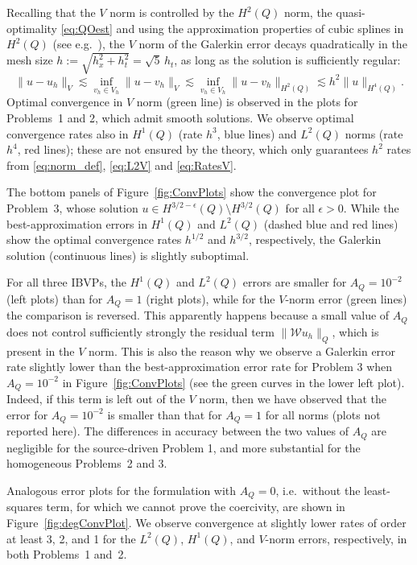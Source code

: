 \documentclass[a4paper]{article}
\theoremstyle{plain}
\theoremstyle{definition}
\newcommand{\operator}[1]{\mathcal{#1}}
\newcommand{\oW}{{\operator{W}}}
\begin{document}
Recalling that the $V$ norm is controlled by the $H^2(Q)$ norm, the quasi-optimality \eqref{eq:QOest} and using the approximation properties of cubic splines in $H^2(Q)$ (see e.g.\ \cite[Lemma~3.1]{BazilevsBeiraoCottrellHughesSangalli2006}), the $V$ norm of the Galerkin error decays quadratically in the mesh size $h:=\sqrt{h_x^2+h_t^2}=\sqrt5\, h_t$,
as long as the solution is sufficiently regular:
\begin{equation}\label{eq:RatesV}
\|u - u_h\|_V
\lesssim\inf_{v_h\in V_h}\|u - v_h\|_V
\lesssim\inf_{v_h\in V_h}\|u-v_h\|_{H^2(Q)}
\lesssim h^2 \|u\|_{H^4(Q)}.
\end{equation}
Optimal convergence in $V$ norm (green line) is observed in the plots for Problems~1 and 2, which admit smooth solutions.
We observe optimal convergence rates also in $H^1(Q)$ (rate $h^3$, blue lines) and $L^2(Q)$ norms (rate $h^4$, red lines); these are not ensured by the theory, which only guarantees $h^2$ rates from \eqref{eq:norm_def}, \eqref{eq:L2V} and \eqref{eq:RatesV}.

The bottom panels of Figure~\ref{fig:ConvPlots} show the convergence plot for Problem~3, whose solution $u\in H^{3/2-\epsilon}(Q)\setminus H^{3/2}(Q)$ for all $\epsilon>0$.
While the best-approximation errors in $H^1(Q)$ and $L^2(Q)$ (dashed blue and red lines) show the optimal convergence rates $h^{1/2}$ and $h^{3/2}$, respectively, the Galerkin solution (continuous lines) is slightly suboptimal.

For all three IBVPs, the $H^1(Q)$ and $L^2(Q)$ errors are smaller for $A_Q=10^{-2}$ (left plots) than for $A_Q=1$ (right plots), while for the $V$-norm error (green lines) the comparison is reversed.
This apparently happens because a small value of $A_Q$ does not control sufficiently strongly the residual term $\|\oW u_h\|_Q$, which is present in the $V$ norm.
This is also the reason why we observe a Galerkin error rate slightly lower than the best-approximation error rate for Problem 3 when $A_Q=10^{-2}$ in Figure~\ref{fig:ConvPlots} (see the green curves in the lower left plot).
Indeed, if this term is left out of the $V$ norm, then we have observed that the error for $A_Q=10^{-2}$ is smaller than that for $A_Q=1$ for all norms (plots not reported here).
The differences in accuracy between the two values of $A_Q$ are negligible for the source-driven Problem 1, and more substantial for the homogeneous Problems~2 and 3.

Analogous error plots for the formulation with $A_Q=0$, i.e.\ without the least-squares term, for which we cannot prove the coercivity, are shown in Figure~\ref{fig:degConvPlot}.
We observe convergence at slightly lower rates of order at least 3, 2, and 1 for the $L^2(Q)$, $H^1(Q)$, and $V$-norm errors, respectively, in both Problems~1 and~2.
\end{document}

